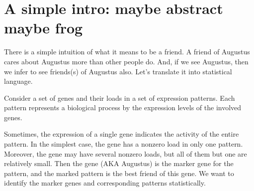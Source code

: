 \documentclass{llncs}
\begin{document}
\begin{abstract}

\textcolor{green}{We define a tag's most friendly cloud as a cloud that pays maximal rank-normalized attention to the tag.}
\textcolor{blue}{ -- we will return here --} \textcolor{purple}{
Suppose we have a set of {\tag}s and a set of fuzzy set of {\tag}s, which we will refer to as {\cloud}s, and we have the {\tag}-to-{\cloud} relation quantified as a scalar for each $\left( {\tag},{\cloud}\right)$ pair. An example is: {\tag}s are genes, {\cloud}s are gene expression patterns, and the scalars are loads of the genes in the patterns. Sometimes, an observation that a gene is expressed implies the expression of a particular pattern (the simplest case is: the gene has nonzero load only in that pattern). If so, we say that the gene marks the pattern. Here we describe a statistical test that identifies pairs of a marker {\tag} and the marked {\cloud}. The test is based on rank statistics and it does not rely on propositions about the distribution of the relation quantity. The marked {\cloud} is referred to as the {\tag}'s best friend, and the test is named "the best friends test" or "the gene's best friends test". The statistics naturally expand to the case when a {\tag} selects (separates) a subset of {\cloud}s, thus having more than one best friend. The code (currently, only R) is available at \url{https://github.com/favorov/best-friends}
}
\end{abstract}
%
\section{A simple intro: maybe abstract maybe frog}

There is a simple intuition of what it means to be a friend. A friend of Augustus cares about Augustus more than other people do. And, if we see Augustus, then we infer to see friends(s) of Augustus also. Let’s translate it into statistical language.

Consider a set of genes and their loads in a set of expression patterns. Each pattern represents a biological process by the expression levels of the involved genes. 

Sometimes, the expression of a single gene indicates the activity of the entire pattern. In the simplest case, the gene has a nonzero load in only one pattern. 
Moreover, the gene may have several nonzero loads, but all of them but one are relatively small. Then the gene (AKA Augustus) is the marker gene for the pattern, and the marked pattern is the best friend of this gene. We want to identify the marker genes and corresponding patterns statistically.  
\end{document}
